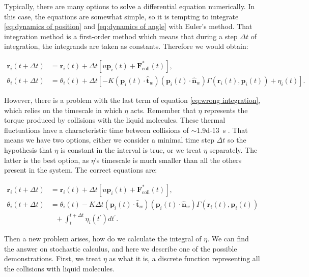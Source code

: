 Typically, there are many options to solve a differential equation numerically. In this case, the equations are somewhat simple, so it is tempting to integrate \eqref{eq:dynamics of position} and \eqref{eq:dynamics of angle} with Euler's method. That integration method is a first-order method which means that during a step $\Delta t$ of integration, the integrands are taken as constants. Therefore we would obtain:

\begin{align}
    \textbf{r}_i(t+\Delta t) &=  \textbf{r}_i(t) + \Delta t[u \textbf{p}_i(t) + \textbf{F}^*_{\text{coll}}(t)], \\
    \label{eq:wrong integration}
    \theta_i(t+\Delta t) &=  \theta_i(t) + \Delta t[- K (\textbf{p}_i(t) \cdot \hat{\textbf{t}}_w)  (\textbf{p}_i(t) \cdot \hat{\textbf{n}}_w) \Gamma(\textbf{r}_i(t), \textbf{p}_i(t)) + \eta_i(t)].
\end{align}

However, there is a problem with the last term of equation \eqref{eq:wrong integration}, which relies on the timescale in which $\eta$ acts. Remember that $\eta$ represents the torque produced by collisions with the liquid molecules. These thermal fluctuations have a characteristic time between collisions of $\sim$\SI{1.9d-13}{\second} \cite{Soto2016KineticPhenomena}. That means we have two options, either we consider a minimal time step $\Delta t$ so the hypothesis that $\eta$ is constant in the interval is true, or we treat $\eta$ separately. The latter is the best option, as $\eta$'s timescale is much smaller than all the others present in the system. The correct equations are:

\begin{align}
    \textbf{r}_i(t+\Delta t) &=  \textbf{r}_i(t) + \Delta t[u \textbf{p}_i(t) + \textbf{F}^*_{\text{coll}}(t)], \\
    \theta_i(t+\Delta t) &=  \theta_i(t) - K \Delta t  (\textbf{p}_i(t) \cdot \hat{\textbf{t}}_w)  (\textbf{p}_i(t) \cdot \hat{\textbf{n}}_w) \Gamma(\textbf{r}_i(t), \textbf{p}_i(t)) \nonumber \\
     &\ \ \ + \int_t^{t+\Delta t}\eta_i(t^\prime)dt^\prime .
\end{align}


Then a new problem arises, how do we calculate the integral of $\eta$. We can find the answer on stochastic calculus, and here we describe one of the possible demonstrations. First, we treat $\eta$ as what it is, a discrete function representing all the collisions with liquid molecules.

